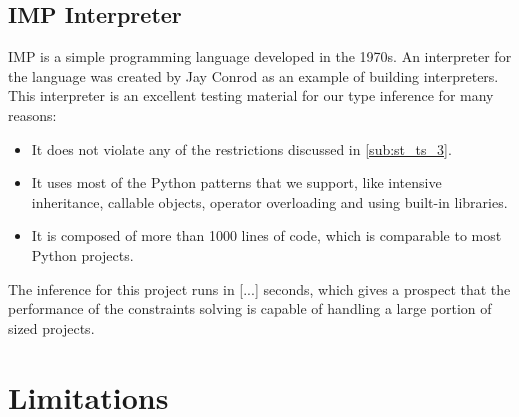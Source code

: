 \subsection{IMP Interpreter}
IMP \cite{imp} is a simple programming language developed in the 1970s. An interpreter for the language \cite{imp_i} was created by Jay Conrod as an example of building interpreters. This interpreter is an excellent testing material for our type inference for many reasons:

\begin{itemize}
	\item It does not violate any of the restrictions discussed in \ref{sub:st_ts_3}.
	\item It uses most of the Python patterns that we support, like intensive inheritance, callable objects, operator overloading and using built-in libraries.
	\item It is composed of more than 1000 lines of code, which is comparable to most Python projects.
\end{itemize}

The inference for this project runs in [...] seconds, which gives a prospect that the performance of the constraints solving is capable of handling a large portion of sized projects.

\section{Limitations}